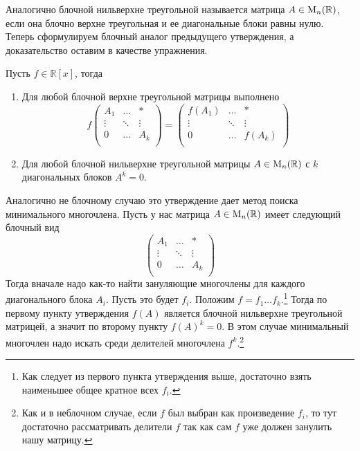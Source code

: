 Аналогично блочной нильверхне треугольной называется матрица $A\in\operatorname{M}_{n}(\mathbb R)$, если она блочно верхне треугольная и ее диагональные блоки равны нулю. Теперь сформулируем блочный аналог предыдущего утверждения, а доказательство оставим в качестве упражнения.

\begin{claim}\label{claim::PolyOfUpperBlock}
Пусть $f\in\mathbb R[x]$, тогда
\begin{enumerate}
\item Для любой блочной верхне треугольной матрицы выполнено 
\[
f
\begin{pmatrix}
{A_1}&{\ldots}&{*}\\
{\vdots}&{\ddots}&{\vdots}\\
{0}&{\ldots}&{A_k}\\
\end{pmatrix}
=
\begin{pmatrix}
{f(A_1)}&{\ldots}&{*}\\
{\vdots}&{\ddots}&{\vdots}\\
{0}&{\ldots}&{f(A_k)}\\
\end{pmatrix}
\]
\item Для любой блочной нильверхне треугольной матрицы $A\in\operatorname{M}_{n}(\mathbb R)$ с $k$ диагональных блоков $A^k = 0$.
\end{enumerate}
\end{claim}

Аналогично не блочному случаю это утверждение дает метод поиска минимального многочлена. Пусть у нас матрица $A\in\operatorname{M}_{n}(\mathbb R)$ имеет следующий блочный вид
\[
\begin{pmatrix}
{A_1}&{\ldots}&{*}\\
{\vdots}&{\ddots}&{\vdots}\\
{0}&{\ldots}&{A_k}\\
\end{pmatrix}
\]
Тогда вначале надо как-то найти зануляющие многочлены для каждого диагонального блока $A_i$. Пусть это будет $f_i$. Положим $f = f_1\ldots f_k$.\footnote{Как следует из первого пункта утверждения выше, достаточно взять наименьшее общее кратное всех $f_i$.} Тогда по первому пункту утверждения $f(A)$ является блочной нильверхне треугольной матрицей, а значит по второму пункту $f(A)^k = 0$. В этом случае минимальный многочлен надо искать среди делителей многочлена $f^k$.\footnote{Как и в неблочном случае, если $f$ был выбран как произведение $f_i$, то тут достаточно рассматривать делители $f$ так как сам $f$ уже должен занулить нашу матрицу.}


